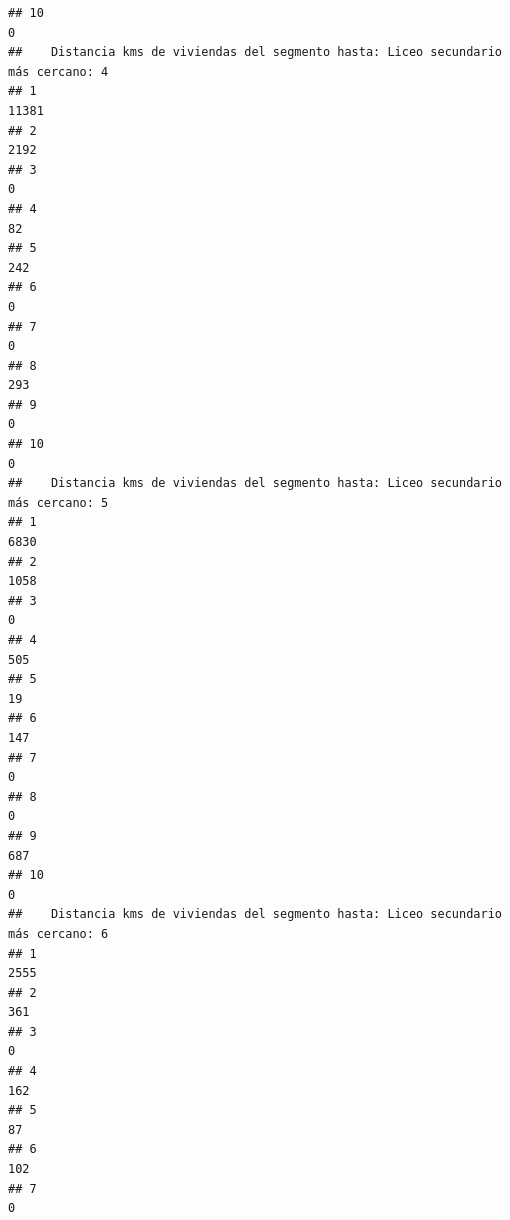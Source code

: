 \documentclass[11pt,]{article}
\begin{document}
\begin{verbatim}
## 10                                                                              0
##    Distancia kms de viviendas del segmento hasta: Liceo secundario más cercano: 4
## 1                                                                           11381
## 2                                                                            2192
## 3                                                                               0
## 4                                                                              82
## 5                                                                             242
## 6                                                                               0
## 7                                                                               0
## 8                                                                             293
## 9                                                                               0
## 10                                                                              0
##    Distancia kms de viviendas del segmento hasta: Liceo secundario más cercano: 5
## 1                                                                            6830
## 2                                                                            1058
## 3                                                                               0
## 4                                                                             505
## 5                                                                              19
## 6                                                                             147
## 7                                                                               0
## 8                                                                               0
## 9                                                                             687
## 10                                                                              0
##    Distancia kms de viviendas del segmento hasta: Liceo secundario más cercano: 6
## 1                                                                            2555
## 2                                                                             361
## 3                                                                               0
## 4                                                                             162
## 5                                                                              87
## 6                                                                             102
## 7                                                                               0

\end{verbatim}
\end{document}
